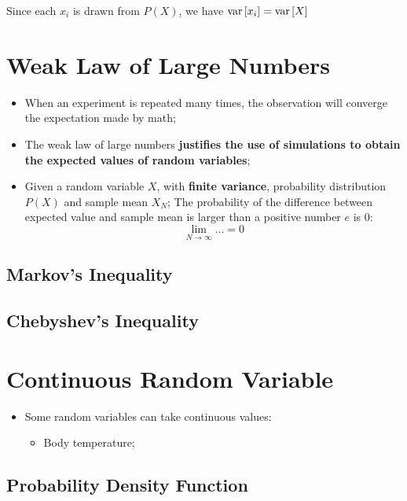     Since each $ x_{i} $ is drawn from $ P(X) $, we have $ \operatorname{var} \left[ x_{i} \right] = \operatorname{var} \left[ X \right] $

\section{Weak Law of Large Numbers}

  \begin{itemize}
    \item When an experiment is repeated many times, the observation will converge the expectation made by math;
    \item The weak law of large numbers \textbf{justifies the use of simulations to obtain the expected values of random variables};
    \item Given a random variable $ X $, with \textbf{finite variance}, probability distribution $ P(X) $ and sample mean $ X_{N} $; The probability of the difference between expected value and sample mean is larger than a positive number $ e $ is 0:
    \begin{equation}
      \lim_{N \to \infty} ... = 0
    \end{equation}
  \end{itemize}

  \subsection{Markov's Inequality}
  \subsection{Chebyshev's Inequality}

\section{Continuous Random Variable}

  \begin{itemize}
    \item Some random variables can take continuous values:
    \begin{itemize}
      \item Body temperature;
    \end{itemize}
  \end{itemize}

  \subsection{Probability Density Function}

